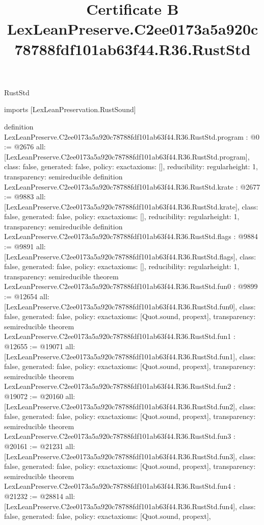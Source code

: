 \begin{lexlean}{RustStd}
\title{Certificate B LexLeanPreserve.C2ee0173a5a920c78788fdf101ab63f44.R36.RustStd}
\begin{coremodule}
imports [LexLeanPreservation.RustSound]

definition LexLeanPreserve.C2ee0173a5a920c78788fdf101ab63f44.R36.RustStd.program : @0 := @2676 {
  all: [LexLeanPreserve.C2ee0173a5a920c78788fdf101ab63f44.R36.RustStd.program],
  class: false,
  generated: false,
  policy: exact{axioms: []},
  reducibility: regular{height: 1},
  transparency: semireducible
}
definition LexLeanPreserve.C2ee0173a5a920c78788fdf101ab63f44.R36.RustStd.krate : @2677 := @9883 {
  all: [LexLeanPreserve.C2ee0173a5a920c78788fdf101ab63f44.R36.RustStd.krate],
  class: false,
  generated: false,
  policy: exact{axioms: []},
  reducibility: regular{height: 1},
  transparency: semireducible
}
definition LexLeanPreserve.C2ee0173a5a920c78788fdf101ab63f44.R36.RustStd.flags : @9884 := @9891 {
  all: [LexLeanPreserve.C2ee0173a5a920c78788fdf101ab63f44.R36.RustStd.flags],
  class: false,
  generated: false,
  policy: exact{axioms: []},
  reducibility: regular{height: 1},
  transparency: semireducible
}
theorem LexLeanPreserve.C2ee0173a5a920c78788fdf101ab63f44.R36.RustStd.fun0 : @9899 := @12654 {
  all: [LexLeanPreserve.C2ee0173a5a920c78788fdf101ab63f44.R36.RustStd.fun0],
  class: false,
  generated: false,
  policy: exact{axioms: [Quot.sound, propext]},
  transparency: semireducible
}
theorem LexLeanPreserve.C2ee0173a5a920c78788fdf101ab63f44.R36.RustStd.fun1 : @12655 := @19071 {
  all: [LexLeanPreserve.C2ee0173a5a920c78788fdf101ab63f44.R36.RustStd.fun1],
  class: false,
  generated: false,
  policy: exact{axioms: [Quot.sound, propext]},
  transparency: semireducible
}
theorem LexLeanPreserve.C2ee0173a5a920c78788fdf101ab63f44.R36.RustStd.fun2 : @19072 := @20160 {
  all: [LexLeanPreserve.C2ee0173a5a920c78788fdf101ab63f44.R36.RustStd.fun2],
  class: false,
  generated: false,
  policy: exact{axioms: [Quot.sound, propext]},
  transparency: semireducible
}
theorem LexLeanPreserve.C2ee0173a5a920c78788fdf101ab63f44.R36.RustStd.fun3 : @20161 := @21231 {
  all: [LexLeanPreserve.C2ee0173a5a920c78788fdf101ab63f44.R36.RustStd.fun3],
  class: false,
  generated: false,
  policy: exact{axioms: [Quot.sound, propext]},
  transparency: semireducible
}
theorem LexLeanPreserve.C2ee0173a5a920c78788fdf101ab63f44.R36.RustStd.fun4 : @21232 := @28814 {
  all: [LexLeanPreserve.C2ee0173a5a920c78788fdf101ab63f44.R36.RustStd.fun4],
  class: false,
  generated: false,
  policy: exact{axioms: [Quot.sound, propext]},
}
\end{coremodule}
\end{lexlean}
